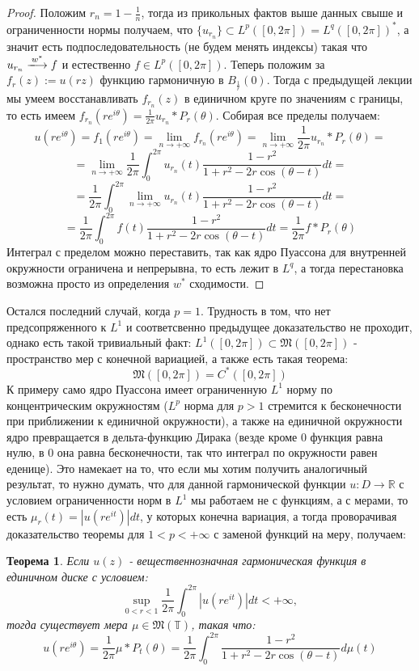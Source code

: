 \documentclass[12pt,a4paper]{article} %
\newtheorem{theorem}{Теорема}
\newcommand{\R}{\mathbb{R}}
\begin{document}
	\begin{proof}
		Положим $r_n=1-\frac{1}{n}$, тогда из прикольных фактов выше данных свыше и ограниченности нормы получаем, что $\{u_{r_n}\}\subset L^p([0,2\pi])={L^q([0,2\pi])}^{*}$, а значит есть подпоследовательность (не будем менять индексы) такая что $u_{r_n}\xlongrightarrow{w^{*}}f$ и естественно $f\in L^p([0,2\pi])$. Теперь положим за $f_r(z):=u(rz)$ функцию гармоничную в $B_{\frac{1}{r}}(0)$. Тогда с предыдущей лекции мы умеем восстанавливать $f_{r_n}(z)$ в единичном круге по значениям с границы, то есть имеем $f_{r_n}(re^{i\theta})=\frac{1}{2\pi}u_{r_n}*P_{r}(\theta)$. Собирая все пределы получаем:
		$$u(re^{i\theta})=f_1(re^{i\theta})=\lim_{n\rightarrow+\infty}f_{r_n}(re^{i\theta})=\lim_{n\rightarrow+\infty}\frac{1}{2\pi}u_{r_n}*P_{r}(\theta)=$$
		$$=\lim_{n\rightarrow+\infty}\frac{1}{2\pi}\int_0^{2\pi}u_{r_n}(t)\frac{1-r^2}{1+r^2-2r\cos(\theta-t)}dt=$$
		$$=\frac{1}{2\pi}\int_0^{2\pi}\lim_{n\rightarrow+\infty}u_{r_n}(t)\frac{1-r^2}{1+r^2-2r\cos(\theta-t)}dt=$$
		$$=\frac{1}{2\pi}\int_0^{2\pi}f(t)\frac{1-r^2}{1+r^2-2r\cos(\theta-t)}dt=\frac{1}{2\pi}f*P_r(\theta)$$
		Интеграл с пределом можно переставить, так как ядро Пуассона для внутренней окружности ограничена и непрерывна, то есть лежит в $L^q$, а тогда перестановка возможна просто из определения $w^{*}$ сходимости.
	\end{proof}
	Остался последний случай, когда $p=1$. Трудность в том, что нет предсопряженного к $L^1$ и соответсвенно предыдущее доказательство не проходит, однако есть такой тривиальный факт: $L^1([0,2\pi])\subset\mathfrak{M}([0,2\pi])$ - пространство мер с конечной вариацией, а также есть такая теорема:
	$$\mathfrak{M}([0,2\pi])=C^{*}([0,2\pi])$$
	К примеру само ядро Пуассона имеет ограниченную $L^1$ норму по концентрическим окружностям ($L^p$ норма для $p>1$ стремится к бесконечности при приближении к единичной окружности), а также на единичной окружности ядро превращается в дельта-функцию Дирака (везде кроме 0 функция равна нулю, в 0 она равна бесконечности, так что интеграл по окружности равен еденице). Это намекает на то, что если мы хотим получить аналогичный результат, то нужно думать, что для данной гармонической функции $u:D\rightarrow\R$ с условием ограниченности норм в $L^1$ мы работаем не с функциям, а с мерами, то есть $\mu_r(t)=|u(re^{it})|dt$, у которых конечна вариация, а тогда проворачивая доказательство теоремы для $1<p<+\infty$ с заменой функций на меру, получаем:
	\begin{theorem}
		Если $u(z)$ - вещественнозначная гармоническая функция в единичном диске с условием:
		$$\sup\limits_{0<r<1}\frac{1}{2\pi}\int_0^{2\pi}|u(re^{it})|dt<+\infty,$$
		тогда существует мера $\mu\in\mathfrak{M}(\mathbb{T})$, такая что:
		$$u(re^{i\theta})=\frac{1}{2\pi}\mu*P_t(\theta)=\frac{1}{2\pi}\int_0^{2\pi}\frac{1-r^2}{1+r^2-2r\cos(\theta-t)}d\mu(t)$$
	\end{theorem}
\end{document}

